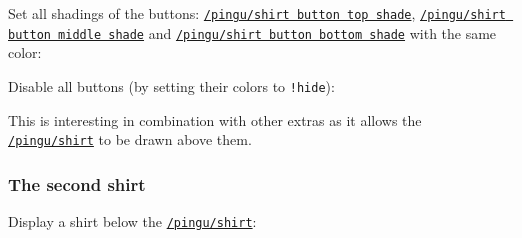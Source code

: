 \documentclass[parskip=half,english,numbers=noenddot,footnotes=nomultiple,oneside]{scrartcl}
\def\lpingu#1{\lstinline[style=lstpingu,language=pingulang]'#1'}
\newcommand*\keyref[2][/pingu/]{\hyperref[pk:#1#2]{\lpingu{#1#2}}}
\begin{document}
{\def\pingu@color@shirt@button@top{<shirt-button-top>}\def\pingu@color@shirt{<shirt-color>}
\begin{tcblisting}{}
\begin{tikzpicture}
	\pingu[shirt, shirt button bottom shade=green]
\end{tikzpicture}
\end{tcblisting}
\endsubkeyexplain}

Set all shadings of the buttons: \keyref{shirt button top shade}, \keyref{shirt button middle shade} and \keyref{shirt button bottom shade} with the same color:
\begin{tcblisting}{}
\begin{tikzpicture}
	\pingu[shirt, shirt buttons shade=green]
\end{tikzpicture}
\end{tcblisting}
\endsubkeyexplain

Disable all buttons (by setting their colors to \lpingu{!hide}):
\begin{tcblisting}{}
\end{tcblisting}
\endsubkeyexplain

This is interesting in combination with other extras as it allows the \keyref{shirt} to be drawn above them.
\begin{tcblisting}{}
\end{tcblisting}
\endsubkeyexplain

\subsubsection{The second shirt}
	Display a shirt below the \keyref{shirt}:
\begin{tcblisting}{}
\begin{tikzpicture}
	\pingu[second shirt=green, shirt]
\end{tikzpicture}
\end{tcblisting}
\endkeyexplain
\end{document}
